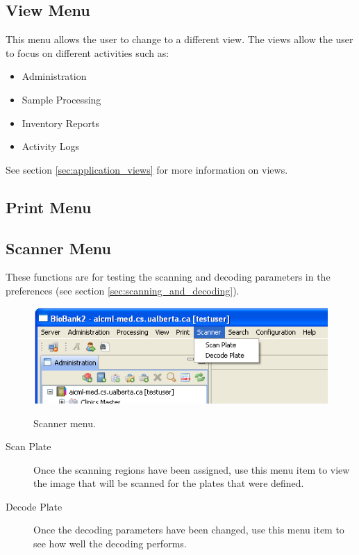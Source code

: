 \subsection{View Menu}
This menu allows the user to change to a different view. The views allow the
user to focus on different activities such as:
\begin{itemize}
\item Administration
\item Sample Processing
\item Inventory Reports
\item Activity Logs
\end{itemize}

See section \ref{sec:application_views} for more information on views.


\subsection{Print Menu}

\subsection{Scanner Menu}
These functions are for testing the scanning and decoding parameters in the
preferences (see section \ref{sec:scanning_and_decoding}).
\begin{figure}[H]
  \centering
  \scalebox{0.5}
	   { \includegraphics*{screenshots/overview/main_menu_scanner} }
	   \caption{Scanner menu.}
	   \label{fig:main_menu_scanner}
\end{figure}
\begin{description}
\item[Scan Plate] Once the scanning regions have been assigned, use this menu
  item to view the image that will be scanned for the plates that were
  defined.
\item[Decode Plate] Once the decoding parameters have been changed, use this
  menu item to see how well the decoding performs.
\end{description}

